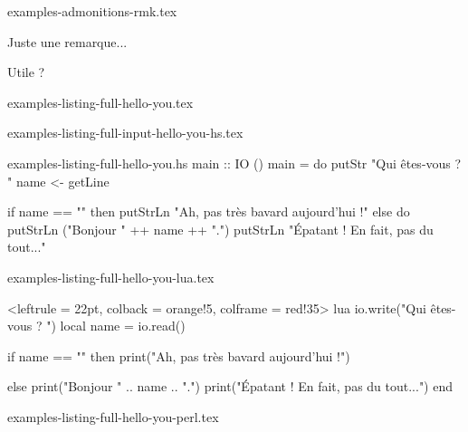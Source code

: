 \begin{filecontents*}[overwrite]{examples-admonitions-rmk.tex}
\begin{tdocrem}
    Juste une remarque...
\end{tdocrem}

\begin{tdocrem}
    Utile ?
\end{tdocrem}
\end{filecontents*}


\begin{filecontents*}[overwrite]{examples-listing-full-hello-you.tex}
\end{filecontents*}


\begin{filecontents*}[overwrite]{examples-listing-full-input-hello-you-hs.tex}
\end{filecontents*}


\begin{filecontents*}[overwrite]{examples-listing-full-hello-you.hs}
main :: IO ()
main = do
  putStr "Qui êtes-vous ? "
  name <- getLine

  if name == ""
    then putStrLn "Ah, pas très bavard aujourd'hui !"
    else do
      putStrLn ("Bonjour " ++ name ++ ".")
      putStrLn "Épatant ! En fait, pas du tout..."
\end{filecontents*}


\begin{filecontents*}[overwrite]{examples-listing-full-hello-you-lua.tex}
\begin{tdoccode}[style = solarized-light, linenos]%
                <leftrule = 22pt, colback = orange!5, colframe = red!35>%
                {lua}
io.write("Qui êtes-vous ? ")
local name = io.read()

if name == "" then
    print("Ah, pas très bavard aujourd'hui !")

else
    print("Bonjour " .. name .. ".")
    print("Épatant ! En fait, pas du tout...")
end
\end{tdoccode}
\end{filecontents*}


\begin{filecontents*}[overwrite]{examples-listing-full-hello-you-perl.tex}
\end{filecontents*}


